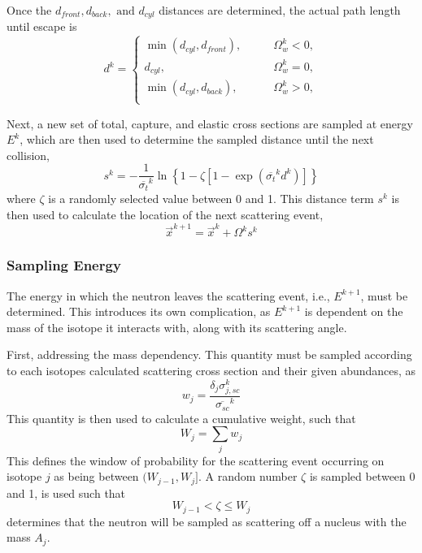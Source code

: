 Once the $d_{front}, d_{back}, \text{ and } d_{cyl}$ distances are determined, the actual path length until escape is
\begin{equation}
    d^k =
    \begin{cases}
        \min{ \left( d_{cyl}, d_{front} \right)},   \qquad &\Omega_{w}^k < 0,\\
        d_{cyl},                                    \qquad &\Omega_{w}^k = 0, \\
        \min{ \left( d_{cyl}, d_{back} \right)},    \qquad &\Omega_{w}^k > 0,\\
    \end{cases}
\end{equation}

Next, a new set of total, capture, and elastic cross sections are sampled at energy $E^k$, which are then used to determine the sampled distance until the next collision,
\begin{equation}
    \label{eq:free-path-sampling}
    s^k = -\frac{1}{\overline{\sigma_{t} }^{k} }  \ln{\left\{
                1 - \zeta \left[ 1 - \exp{\left( \overline{\sigma_{t}}^{k} d^k \right)} \right]
    \right\}}
\end{equation}
where $\zeta$ is a randomly selected value between 0 and 1. This distance term $s^{k}$ is then used to calculate the location of the next scattering event,
\begin{equation}
    \label{eq:sampling-new-location}
    \overrightarrow{x}^{k+1} = \overrightarrow{x}^{k} + \Omega^{k}s^{k}
\end{equation}

\subsubsection{Sampling Energy}
\label{sec:sampling-energy-ms}
The energy in which the neutron leaves the scattering event, i.e., $E^{k+1}$, must be determined. This introduces its own complication, as $E^{k+1}$ is dependent on the mass of the isotope it interacts with, along with its scattering angle. 

First, addressing the mass dependency. This quantity must be sampled according to each isotopes calculated scattering cross section and their given abundances, as
\begin{equation}
    w_{j} = \frac{\delta_j \sigma_{j,sc}^{k} }{\overline{\sigma_{sc}}^{k}}
\end{equation}
This quantity is then used to calculate a cumulative weight, such that
\begin{equation}
    W_j = \sum_{j} w_j
\end{equation}
This defines the window of probability for the scattering event occurring on isotope $j$ as being between $(W_{j-1}, W_{j}]$.
A random number $\zeta$ is sampled between 0 and 1, is used such that
\begin{equation}
    W_{j-1} < \zeta \leq W_{j}
\end{equation}
determines that the neutron will be sampled as scattering off a nucleus with the mass $A_j$.

